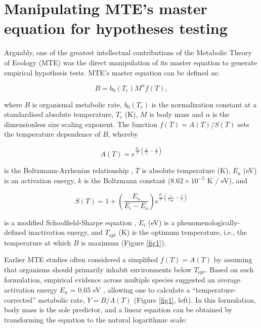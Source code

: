 \documentclass[a4paper,12pt]{article}
\begin{document}
\bigskip
\bigskip

\section{Manipulating MTE's master equation for hypotheses testing}
\label{exploring}

Arguably, one of the greatest intellectual contributions of the Metabolic Theory of Ecology (MTE) was the direct manipulation of its master equation to generate empirical hypothesis tests. MTE's master equation can be defined as:

\begin{equation}
  B = b_0(T_c) M^\alpha f(T),
  \label{eq1}
\end{equation}

where $B$ is organismal metabolic rate, $b_0(T_c)$ is the normalization constant at a standardised absolute temperature, $T_c$ (K), $M$ is body mass and $\alpha$ is the dimensionless size scaling exponent. The function $f(T) = A(T)/S(T)$ sets the temperature dependence of $B$, whereby 

\begin{equation}
    A(T) = e^{\frac{E_a}{k}\left(\frac{1}{T_c} - \frac{1}{T}\right)}
    \label{eqAB}
\end{equation} 

is the Boltzmann-Arrhenius relationship \citep{gillooly2001science}, $T$ is absolute temperature (K), $E_a$ (eV) is an activation energy, $k$ is the Boltzmann constant ($8.62 \times 10^{-5}$ K / eV), and

\begin{equation}
    S(T) = 1 + \left(\frac{E_a}{E_i - E_a}\right) e^{\frac{E_i}{k}\left(\frac{1}{T_{opt}} - \frac{1}{T}\right)}
    \label{eqSS}
\end{equation} 

is a modified Schoolfield-Sharpe equation \citep{schoolfield1981, barneche2014ele}, $E_i$ (eV) is a phenomenologically-defined inactivation energy, and $T_{opt}$ (K) is the optimum temperature, i.e., the temperature at which $B$ is maximum (Figure \ref{fig1}).

Earlier MTE studies often considered a simplified $f(T) = A(T)$ by assuming that organisms should primarily inhabit environments below $T_{opt}$. Based on such formulation, empirical evidence across multiple species suggested an average activation energy $E_a$ = 0.65 eV \citep{gillooly2001science, brown2004ecology}, allowing one to calculate a ``temperature-corrected'' metabolic rate, $Y = B / A(T)$ (Figure \ref{fig1}, left). In this formulation, body mass is the sole predictor, and a linear equation can be obtained by transforming the equation to the natural logarithmic scale:
\end{document}
